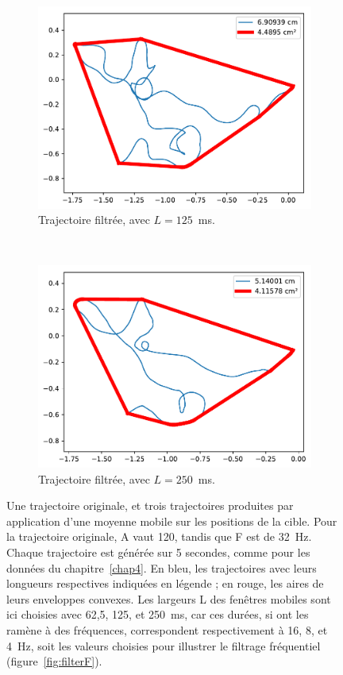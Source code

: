 \begin{figure}[!htb]
\begin{subfigure}[t]{0.49\textwidth}
			\centering
			\includegraphics[width=\textwidth]{figures/ch5/2_19_MovingAverage_2_19_120_32_window_125_0}
			\caption{Trajectoire filtrée, avec $L = 125$~ms.}
			\label{fig:movAv1250}
		\end{subfigure}		
		~
		\begin{subfigure}[t]{0.49\textwidth}
			\centering
			\includegraphics[width=\textwidth]{figures/ch5/2_19_MovingAverage_2_19_120_32_window_250_0}
			\caption{Trajectoire filtrée, avec $L = 250$~ms.}
			\label{fig:movAv2500}
		\end{subfigure}
		\caption[Filtrage des trajectoires par moyenne mobile]{Une trajectoire originale, et trois trajectoires produites par application d'une moyenne mobile sur les positions de la cible. Pour la trajectoire originale, A vaut 120\textdegree{}, tandis que F est de 32~Hz. Chaque trajectoire est générée sur 5 secondes, comme pour les données du chapitre~\ref{chap4}. En bleu, les trajectoires avec leurs longueurs respectives indiquées en légende ; en rouge, les aires de leurs enveloppes convexes. Les largeurs L des fenêtres mobiles sont ici choisies avec 62,5, 125, et 250~ms, car ces durées, si ont les ramène à des fréquences, correspondent respectivement à 16, 8, et 4~Hz, soit les valeurs choisies pour illustrer le filtrage fréquentiel (figure~\ref{fig:filterF}).}
		\label{fig:movingAverageTrajs}
	\end{figure}
	
